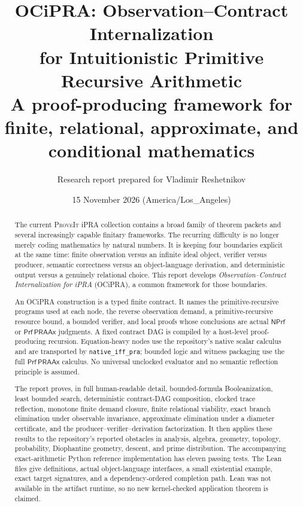 \documentclass[11pt]{article}
\title{\textbf{OCiPRA: Observation--Contract Internalization\\for Intuitionistic Primitive Recursive Arithmetic}\\[0.5em]
\large A proof-producing framework for finite, relational, approximate, and conditional mathematics}
\author{Research report prepared for Vladimir Reshetnikov}
\date{15 November 2026 (America/Los\_Angeles)}
\theoremstyle{definition}
\theoremstyle{remark}
\newcommand{\PRAAx}{\mathsf{PRAAx}}
\newcommand{\NPrf}{\mathsf{NPrf}}
\newcommand{\Prf}{\mathsf{Prf}}
\newcommand{\code}[1]{\texttt{#1}}
\newcommand{\repo}{\textsc{ProveIt}}
\begin{document}
\maketitle

\begin{abstract}
The current \repo{} iPRA collection contains a broad family of theorem packets and several increasingly capable finitary frameworks.  The recurring difficulty is no longer merely coding mathematics by natural numbers.  It is keeping four boundaries explicit at the same time: finite observation versus an infinite ideal object, verifier versus producer, semantic correctness versus an object-language derivation, and deterministic output versus a genuinely relational choice.  This report develops \emph{Observation--Contract Internalization for iPRA} (OCiPRA), a common framework for those boundaries.

An OCiPRA construction is a typed finite contract.  It names the primitive-recursive programs used at each node, the reverse observation demand, a primitive-recursive resource bound, a bounded verifier, and local proofs whose conclusions are actual \(\NPrf\) or \(\Prf\,\PRAAx\) judgments.  A fixed contract DAG is compiled by a host-level proof-producing recursion.  Equation-heavy nodes use the repository's native scalar calculus and are transported by \code{native\_iff\_pra}; bounded logic and witness packaging use the full \(\Prf\,\PRAAx\) calculus.  No universal unclocked evaluator and no semantic reflection principle is assumed.

The report proves, in full human-readable detail, bounded-formula Booleanization, least bounded search, deterministic contract-DAG composition, clocked trace reflection, monotone finite demand closure, finite relational viability, exact branch elimination under observable invariance, approximate elimination under a diameter certificate, and the producer--verifier--derivation factorization.  It then applies these results to the repository's reported obstacles in analysis, algebra, geometry, topology, probability, Diophantine geometry, descent, and prime distribution.  The accompanying exact-arithmetic Python reference implementation has eleven passing tests.  The Lean files give definitions, actual object-language interfaces, a small existential example, exact target signatures, and a dependency-ordered completion path.  Lean was not available in the artifact runtime, so no new kernel-checked application theorem is claimed.
\end{abstract}
\end{document}
